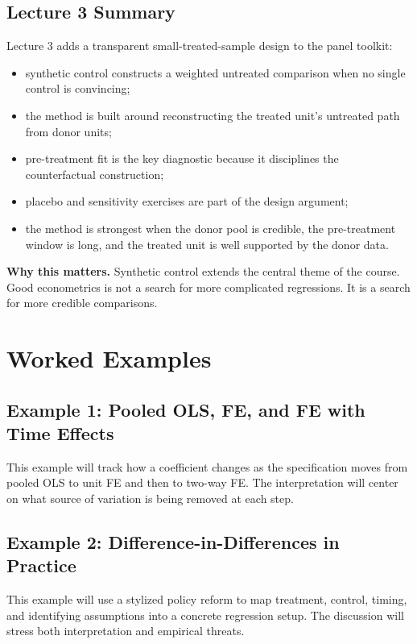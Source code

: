 \subsection{Lecture 3 Summary}
Lecture 3 adds a transparent small-treated-sample design to the panel toolkit:
\begin{itemize}
\item synthetic control constructs a weighted untreated comparison when no single control is convincing;
\item the method is built around reconstructing the treated unit's untreated path from donor units;
\item pre-treatment fit is the key diagnostic because it disciplines the counterfactual construction;
\item placebo and sensitivity exercises are part of the design argument;
\item the method is strongest when the donor pool is credible, the pre-treatment window is long, and the treated unit is well supported by the donor data.
\end{itemize}

\begin{boxD}
\textbf{Why this matters.}
Synthetic control extends the central theme of the course. Good econometrics is not a search for more complicated regressions. It is a search for more credible comparisons.
\end{boxD}

\section{Worked Examples}

\subsection{Example 1: Pooled OLS, FE, and FE with Time Effects}
This example will track how a coefficient changes as the specification moves from pooled OLS to unit FE and then to two-way FE. The interpretation will center on what source of variation is being removed at each step.

\subsection{Example 2: Difference-in-Differences in Practice}
This example will use a stylized policy reform to map treatment, control, timing, and identifying assumptions into a concrete regression setup. The discussion will stress both interpretation and empirical threats.


